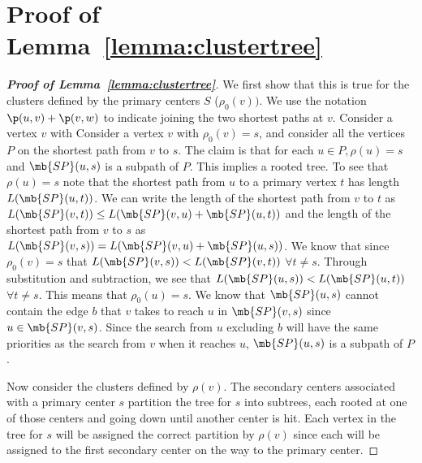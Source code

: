 \section{Proof of Lemma~\ref{lemma:clustertree}}
\label{sec:appendix-implicit}

\begin{proof}[{\bf Proof of Lemma~\ref{lemma:clustertree}}]
	We first show that this is true for the clusters defined by the
	primary centers $S$ ($\rho_0(v))$.
        We use the notation
        $\p(u,v)+\p(v,w)$ to indicate joining the two shortest paths
        at $v$. Consider a vertex $v$ with
        Consider a vertex $v$ with
	$\rho_0(v) = s$, and consider all the vertices $P$ on the shortest
	path from $v$ to $s$.  The claim is that for each $u \in P, \rho(u) =
	s$ and $\mb{SP}(u,s)$ is a subpath of $P$. This implies a
	rooted tree. To see that $\rho(u) = s$ note that the shortest path
	from $u$ to a primary vertex $t$ has length $L(\mb{SP}(u,t))$. We can write the
	length of the shortest path from $v$ to $t$ as
	$L(\mb{SP}(v,t)) \leq L(\mb{SP}(v,u) + \mb{SP}(u,t))$ and the length of the
	shortest path from $v$ to $s$ as
	$L(\mb{SP}(v,s)) = L(\mb{SP}(v,u) + \mb{SP}(u,s))$.
	We know that since $\rho_0(v) = s$
	that $L(\mb{SP}(v,s)) < L(\mb{SP}(v,t))$ $\forall t \neq s$. Through substitution and subtraction,
	we see that $L(\mb{SP}(u,s)) < L(\mb{SP}(u,t))$ $\forall t \neq s$. This means that $\rho_0(u) = s$.
	We know that $\mb{SP}(u,s)$ cannot contain the edge $b$ that $v$ takes to reach $u$
	in $\mb{SP}(v,s)$ since $u \in \mb{SP}(v,s)$. Since the search from $u$ excluding
	$b$ will have the same priorities as the search from $v$ when it
	reaches $u$, $\mb{SP}(u,s)$ is a subpath of $P$.
	
	Now consider the clusters defined by $\rho(v)$.  The secondary centers
	associated with a primary center $s$ partition the tree for $s$ into
	subtrees, each rooted at one of those centers and going down until
	another center is hit.  Each vertex in the tree for $s$ will be
	assigned the correct partition by $\rho(v)$ since each will be
	assigned to the first secondary center on the way to the primary
	center.
\end{proof}




